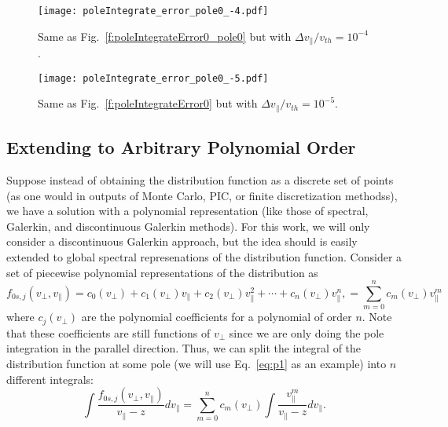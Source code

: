 \begin{figure}[!htb]
	\texttt{[image: poleIntegrate\_error\_pole0\_-4.pdf]}
	\caption{Same as Fig.~\ref{f:poleIntegrateError0_pole0} but with $\Delta v_\parallel/v_{th}=10^{-4}$.}
	\label{f:poleIntegrateError-4_pole0}
\end{figure}

\begin{figure}[!htb]
	\texttt{[image: poleIntegrate\_error\_pole0\_-5.pdf]}
	\caption{Same as Fig.~\ref{f:poleIntegrateError0} but with $\Delta v_\parallel/v_{th}=10^{-5}$.}
	\label{f:poleIntegrateError-5_pole0}
\end{figure}




\subsection{Extending to Arbitrary Polynomial Order}

Suppose instead of obtaining the distribution function as a discrete set of points (as one would in outputs of Monte Carlo, PIC, or finite discretization methodss), we have a solution with a polynomial representation (like those of spectral, Galerkin, and discontinuous Galerkin methods). 
For this work, we will only consider a discontinuous Galerkin approach, but the idea should is easily extended to global spectral represenations of the distribution function.
Consider a set of piecewise polynomial representations of the distribution as
\begin{equation}
	f_{0s,j}(v_\perp, v_\parallel) = c_0(v_\perp) + c_1(v_\perp) v_\parallel + c_2(v_\perp) v_\parallel^2 + \cdots + c_n(v_\perp) v_\parallel^n,
	= \sum_{m=0}^n c_m(v_\perp) v_\parallel^m
	\label{eq:arb_poly_dist} 
\end{equation}
where $c_j(v_\perp)$ are the polynomial coefficients for a polynomial of order $n$. 
Note that these coefficients are still functions of $v_\perp$ since we are only doing the pole integration in the parallel direction.
Thus, we can split the integral of the distribution function at some pole (we will use Eq.~\ref{eq:p1} as an example) into $n$ different integrals:
\begin{equation}
	\int \frac{f_{0s,j}(v_\perp, v_\parallel)}{v_\parallel -z} dv_\parallel = 
	\sum_{m=0}^n c_m(v_\perp)\int \frac{v_\parallel^m}{v_\parallel -z} dv_\parallel.
\end{equation}
 
